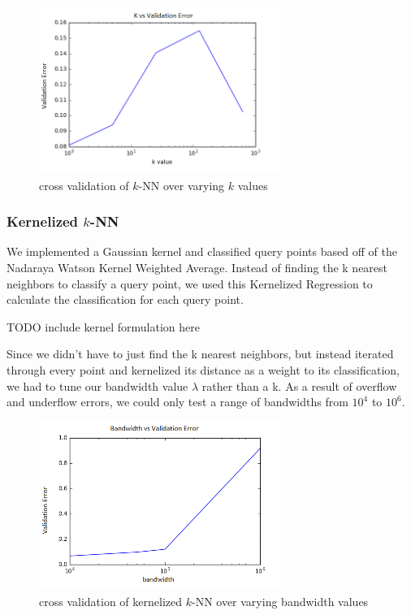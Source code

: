 \documentclass{article} %
\begin{document}
\begin{figure}[h]
\centering
\includegraphics[width=0.7\textwidth]{knn-c-cv.png}
\caption{cross validation of $k$-NN over varying $k$ values}
\label{fig:knn-c-cv}
\end{figure}

\subsubsection{Kernelized $k$-NN}
We implemented a Gaussian kernel and classified query points
based off of the Nadaraya Watson Kernel Weighted Average. Instead of finding
the k nearest neighbors to classify a query point, we used this Kernelized
Regression to calculate the classification for each query point.

TODO include kernel formulation here

Since we didn’t have to just find the k nearest neighbors, but instead
iterated through every point and kernelized its distance as a weight to
its classification, we had to tune our bandwidth value $\lambda$ rather than a k.
As a result of overflow and underflow errors, we could only test a range
of bandwidths from $10^4$ to $10^6$. 


\begin{figure}[h]
\centering
\includegraphics[width=0.7\textwidth]{knn-kernel-bandwidth-cv.png}
\caption{cross validation of kernelized $k$-NN over varying bandwidth values}
\label{fig:knn-kernel-bandwidth-cv}
\end{figure}
\end{document}

